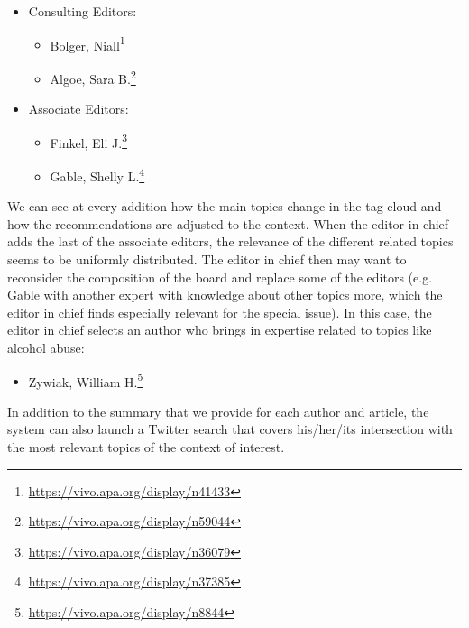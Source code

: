 \begin{itemize}
  \item Consulting Editors:
  \begin{itemize}
    \item Bolger, Niall\footnote{\url{https://vivo.apa.org/display/n41433}}
    \item Algoe, Sara B.\footnote{\url{https://vivo.apa.org/display/n59044}}
  \end{itemize}
  \item Associate Editors:
  \begin{itemize}
      \item Finkel, Eli J.\footnote{\url{https://vivo.apa.org/display/n36079}}
      \item Gable, Shelly L.\footnote{\url{https://vivo.apa.org/display/n37385}}
  \end{itemize}
\end{itemize}
We can see at every addition how the main topics change in the tag cloud and how
the recommendations are adjusted to the context. When the editor in chief adds
the last of the associate editors, the relevance of the different related topics
seems to be uniformly distributed. The editor in chief then may want to
reconsider the composition of the board and replace some of the editors (e.g.
Gable with another expert with knowledge about other topics more, which the
editor in chief finds especially relevant for the special issue).  In this case,
the editor in chief selects an author who brings in expertise related to topics
like alcohol abuse:
\begin{itemize}
  \item Zywiak, William H.\footnote{\url{https://vivo.apa.org/display/n8844}}
\end{itemize}
In addition to the summary that we provide for each author and article, the
system can also launch a Twitter search that covers his/her/its intersection
with the most relevant topics of the context of interest.


